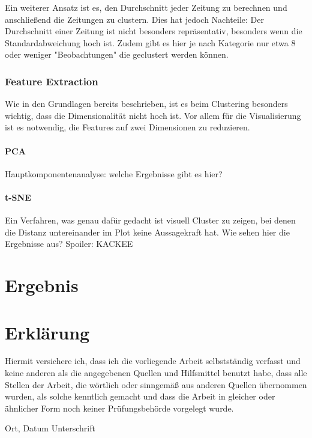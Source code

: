 Ein weiterer Ansatz ist es, den Durchschnitt jeder Zeitung zu berechnen und anschließend die Zeitungen zu clustern. Dies hat jedoch Nachteile: Der Durchschnitt einer Zeitung ist nicht besonders repräsentativ, besonders wenn die Standardabweichung hoch ist. Zudem gibt es hier je nach Kategorie nur etwa 8 oder weniger "Beobachtungen" die geclustert werden können.
\subsection{Feature Extraction}
Wie in den Grundlagen bereits beschrieben, ist es beim Clustering besonders wichtig, dass die Dimensionalität nicht hoch ist. Vor allem für die Visualisierung ist es notwendig, die Features auf zwei Dimensionen zu reduzieren.
\subsubsection*{PCA}
Hauptkomponentenanalyse: welche Ergebnisse gibt es hier?
\subsubsection*{t-SNE}
Ein Verfahren, was genau dafür gedacht ist visuell Cluster zu zeigen, bei denen die Distanz untereinander im Plot keine Aussagekraft hat. Wie sehen hier die Ergebnisse aus? Spoiler: KACKEE

\chapter{Ergebnis}




\chapter*{Erklärung}

Hiermit versichere ich, dass ich die vorliegende Arbeit selbstständig verfasst und keine anderen als die angegebenen Quellen und Hilfsmittel benutzt habe, dass alle Stellen der Arbeit, die wörtlich oder sinngemäß aus anderen Quellen übernommen wurden, als solche kenntlich gemacht und dass die Arbeit in gleicher oder ähnlicher Form noch keiner Prüfungsbehörde vorgelegt wurde.

\vspace{3cm}
Ort, Datum \hspace{5cm} Unterschrift\\

